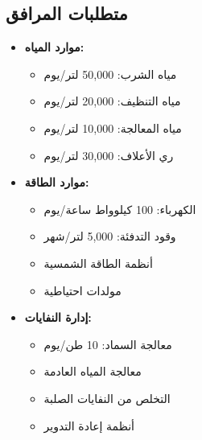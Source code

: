 \subsection{متطلبات المرافق}
\begin{itemize}
    \item \textbf{موارد المياه:}
    \begin{itemize}
        \item مياه الشرب: 50,000 لتر/يوم
        \item مياه التنظيف: 20,000 لتر/يوم
        \item مياه المعالجة: 10,000 لتر/يوم
        \item ري الأعلاف: 30,000 لتر/يوم
    \end{itemize}
    
    \item \textbf{موارد الطاقة:}
    \begin{itemize}
        \item الكهرباء: 100 كيلوواط ساعة/يوم
        \item وقود التدفئة: 5,000 لتر/شهر
        \item أنظمة الطاقة الشمسية
        \item مولدات احتياطية
    \end{itemize}
    
    \item \textbf{إدارة النفايات:}
    \begin{itemize}
        \item معالجة السماد: 10 طن/يوم
        \item معالجة المياه العادمة
        \item التخلص من النفايات الصلبة
        \item أنظمة إعادة التدوير
    \end{itemize}
\end{itemize}

